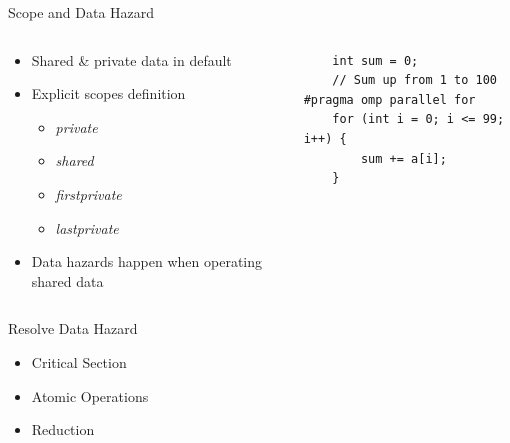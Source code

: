 \begin{frame}[fragile]{Scope and Data Hazard}
\begin{columns}[T]
    \begin{column}{0.5\textwidth}
        \begin{itemize}
            \item Shared \& private data in default
            \item Explicit scopes definition
            \begin{itemize}
                \item \textit{private}
                \item \textit{shared}
                \item \textit{firstprivate}
                \item \textit{lastprivate}
            \end{itemize}
            \item Data hazards happen when operating shared data
        \end{itemize}
    \end{column}
    \begin{column}{0.5\textwidth}
        \begin{verbatim}
    int sum = 0;
    // Sum up from 1 to 100
#pragma omp parallel for
    for (int i = 0; i <= 99; i++) {
        sum += a[i];
    }
\end{verbatim}
    \end{column}
\end{columns}
\end{frame}

\begin{frame}[fragile]{Resolve Data Hazard}
\begin{itemize}
    \item Critical Section
    \item Atomic Operations
    \item Reduction
\end{itemize}
\end{frame}

